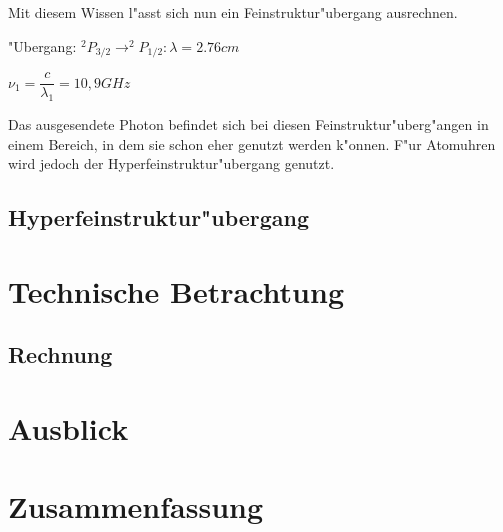 \begin{refsection}
Mit diesem Wissen l"asst sich nun ein Feinstruktur"ubergang ausrechnen. 
\begin{center}
		"Ubergang: $^2P_{3/2} \rightarrow ^2P_{1/2}: \lambda = 2.76cm$
		
		$\nu_1 = \dfrac{c}{\lambda_1} = 10,9 GHz $
\end{center}

Das ausgesendete Photon befindet sich bei diesen Feinstruktur"uberg"angen in einem Bereich, in dem sie schon eher genutzt werden k"onnen. F"ur Atomuhren wird jedoch der  Hyperfeinstruktur"ubergang genutzt. 
\subsection{Hyperfeinstruktur"ubergang}


\section{Technische Betrachtung}

\subsection{Rechnung}

\section{Ausblick} 

\section{Zusammenfassung}

\printbibliography[heading=subbibliography]
\end{refsection}

